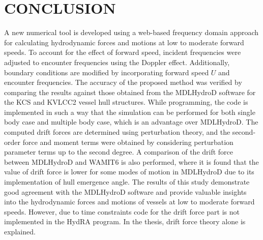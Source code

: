 \chapter{CONCLUSION}



A new numerical tool is developed using a web-based frequency domain approach 
for calculating hydrodynamic forces and motions at low to moderate forward speeds.
To account for the effect of forward speed, incident frequencies were adjusted to 
encounter frequencies using the Doppler effect. Additionally, boundary conditions are 
modified by incorporating forward speed $U$ and encounter frequencies. The accuracy 
of the proposed method was verified by comparing the results against those obtained 
from the MDLHydroD software for the KCS and KVLCC2 vessel hull structures. While programming,
the code is implemented in such a way that the simulation can be performed for both 
single body case and multiple body case, which is an advantage over MDLHydroD.
The computed drift forces are determined using perturbation theory, and the second-order 
force and moment terms were obtained by considering perturbation parameter terms up to the 
second degree. A comparison of the drift force between MDLHydroD and WAMIT6 is also performed, 
where it is found that the value of drift force is lower for some modes of motion in 
MDLHydroD due to its implementation of hull emergence angle. The results of this 
study demonstrate good agreement with the MDLHydroD software and provide valuable insights 
into the hydrodynamic forces and motions of vessels at low to moderate forward speeds. However, 
due to time constraints code for the drift force part is not implemented in the HydRA program. 
In the thesis, drift force theory alone is explained.